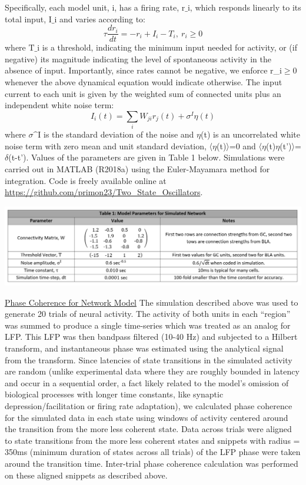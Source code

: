 \begin{refsection}
Specifically, each model unit, i,  has a firing rate, $\text{r_i}$, which responds linearly to its total input, $\text{I_i}$ and varies according to:
$$\tau \frac{dr_i}{dt}=-r_i+I_i-T_i,\ r_i\ge0$$
where $\text{T_i}$ is a threshold, indicating the minimum input needed for activity, or (if negative) its magnitude indicating the level of spontaneous activity in the absence of input. Importantly, since rates cannot be negative, we enforce r_i$\ge$0 whenever the above dynamical equation would indicate otherwise. The input current to each unit is given by the weighted sum of connected units plus an independent white noise term:
$$I_i (t)=\sum_{i}W_{ji} r_j (t)+\sigma^I \eta(t)$$
where $\sigma\text{^I}$ is the standard deviation of the noise and $\eta$(t) is an uncorrelated white noise term with zero mean and unit standard deviation, 〈$\eta$(t)〉=0 and 〈$\eta$(t)$\eta$(t')〉=$\delta$(t-t').
Values of the parameters are given in Table 1 below. Simulations were carried out in MATLAB (R2018a) using the Euler-Mayamara method for integration. Code is freely available online at \url{https://github.com/primon23/Two_State_Oscillators}.

\begin{tablular}
\centering
    \includegraphics[width=\linewidth]{mahmood_22_figures/table1.PNG}
\end{tablular}
\noindent\underline{Phase Coherence for Network Model}
The simulation described above was used to generate 20 trials of neural activity. The activity of both units in each “region” was summed to produce a single time-series which was treated as an analog for LFP. This LFP was then bandpass filtered (10-40 Hz) and subjected to a Hilbert transform, and instantaneous phase was estimated using the analytical signal from the transform. Since latencies of state transitions in the simulated activity are random (unlike experimental data where they are roughly bounded in latency and occur in a sequential order, a fact likely related to the model’s omission of biological processes with longer time constants, like synaptic depression/facilitation or firing rate adaptation), we calculated phase coherence for the simulated data in each state using windows of activity centered around the transition from the moreless coherent state. Data across trials were aligned to state transitions from the moreless coherent states and snippets with radius = 350ms (minimum duration of states across all trials) of the LFP phase were taken around the transition time. Inter-trial phase coherence calculation was performed on these aligned snippets as described above.


\end{refsection}

